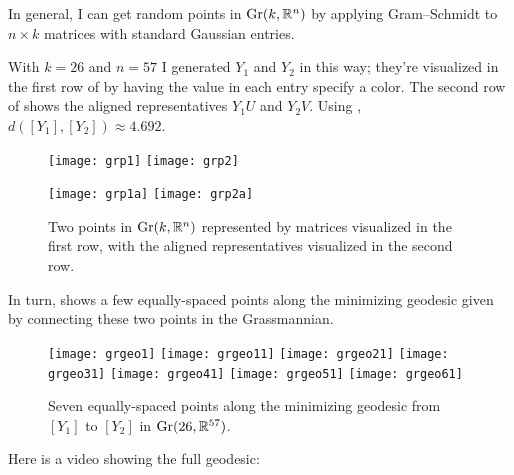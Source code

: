 \begin{example}	
In general, I can get random points in $\operatorname{Gr}(k,\mathbb{R}^n)$ by applying Gram–Schmidt to $n\times k$ matrices with standard Gaussian entries. 

	With $k=26$ and $n=57$ I generated $Y_1$ and $Y_2$ in this way; they're visualized in the first row of  by having the value in each entry specify a color. The second row of  shows the aligned representatives $Y_1U$ and $Y_2V$. Using , $d([Y_1],[Y_2]) \approx 4.692$.
	
	\begin{figure}[htbp]
		\centering
			\texttt{[image: grp1]} \qquad \qquad \texttt{[image: grp2]}
			
			\vspace{.2in}
			
			\texttt{[image: grp1a]} \qquad \qquad \texttt{[image: grp2a]}
		\caption{Two points in $\operatorname{Gr}(k,\mathbb{R}^n)$ represented by matrices visualized in the first row, with the aligned representatives visualized in the second row.}
		\label{fig:grassmannian points}
	\end{figure}
	
	In turn,  shows a few equally-spaced points along the minimizing geodesic given by  connecting these two points in the Grassmannian.
	
	\begin{figure}[htbp]
		\centering
			\texttt{[image: grgeo1]} \qquad \texttt{[image: grgeo11]} \qquad \texttt{[image: grgeo21]} \qquad \texttt{[image: grgeo31]} \qquad \texttt{[image: grgeo41]} \qquad \texttt{[image: grgeo51]} \qquad \texttt{[image: grgeo61]} 
		\caption{Seven equally-spaced points along the minimizing geodesic from $[Y_1]$ to $[Y_2]$ in $\operatorname{Gr}(26,\mathbb{R}^{57})$.}
		\label{fig:grassmannian geodesic}
	\end{figure}
	
	Here is a video showing the full geodesic: 
	

\end{example}
